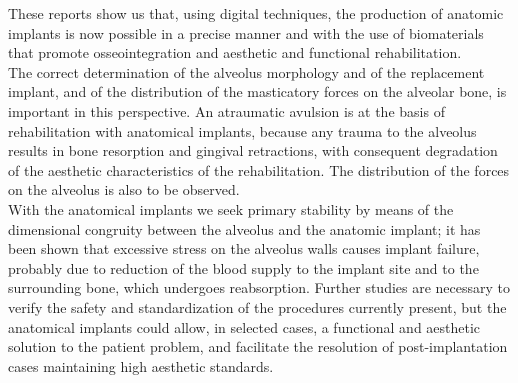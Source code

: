These reports show us that, using digital techniques, the production of anatomic implants is now possible in a precise manner and with the use of biomaterials that promote osseointegration and aesthetic and functional rehabilitation.\\
The correct determination of the alveolus morphology and of the replacement implant, and of the distribution of the masticatory forces on the alveolar bone, is important in this perspective. An atraumatic avulsion is at the basis of rehabilitation with anatomical implants, because any trauma to the alveolus results in bone resorption and gingival retractions, with consequent degradation of the aesthetic characteristics of the rehabilitation. The distribution of the forces on the alveolus is also to be observed. \\ With the anatomical implants we seek primary stability by means of the dimensional congruity between the alveolus and the anatomic implant; it has been shown that excessive stress on the alveolus walls causes implant failure, probably due to reduction of the blood supply to the implant site and to the surrounding bone, which undergoes reabsorption. Further studies are necessary to verify the safety and standardization of the procedures currently present, but the anatomical implants could allow, in selected cases, a functional and aesthetic solution to the patient problem, and facilitate the resolution of post-implantation cases maintaining high aesthetic standards.

